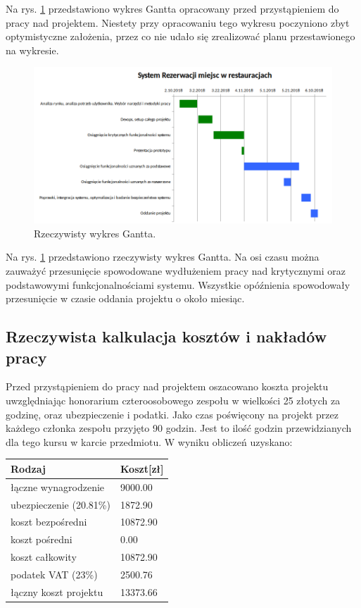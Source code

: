 \documentclass{article}
\begin{document}
Na rys. \ref{fig:gantt} przedstawiono wykres Gantta opracowany przed przystąpieniem do pracy nad projektem. Niestety przy opracowaniu tego wykresu poczyniono zbyt optymistyczne założenia, przez co nie udało się zrealizować planu przestawionego na wykresie.

\begin{figure}[h]
\centering
	\includegraphics[width=1\textwidth]{gantt_real.png}
	\caption{Rzeczywisty wykres Gantta.}
	\label{fig:gantt}
\end{figure}

Na rys. \ref{fig:gantt} przedstawiono rzeczywisty wykres Gantta. Na osi czasu można zauważyć przesunięcie spowodowane wydłużeniem pracy nad krytycznymi oraz podstawowymi funkcjonalnościami systemu. Wszystkie opóźnienia spowodowały przesunięcie w czasie oddania projektu o około miesiąc.


\subsection{Rzeczywista kalkulacja kosztów i nakładów pracy}

Przed przystąpieniem do pracy nad projektem oszacowano koszta projektu uwzględniając honorarium czteroosobowego zespołu w wielkości 25 złotych za godzinę, oraz ubezpieczenie i podatki. Jako czas poświęcony na projekt przez każdego członka zespołu przyjęto 90 godzin. Jest to ilość godzin przewidzianych dla tego kursu w karcie przedmiotu. W wyniku obliczeń uzyskano:
\newpage
\begin{center}
	\begin{tabular}{|p{4cm}|l|}
		\hline
		Rodzaj & Koszt[zł] \\\hline
		łączne wynagrodzenie & 9000.00 \\
		ubezpieczenie (20.81\%) & 1872.90\\
		koszt bezpośredni & 10872.90 \\
		koszt pośredni & 0.00 \\
		koszt całkowity & 10872.90 \\
		podatek VAT (23\%) & 2500.76 \\
		łączny koszt projektu & 13373.66 \\\hline
\end{tabular}
\end{center}
\end{document}
